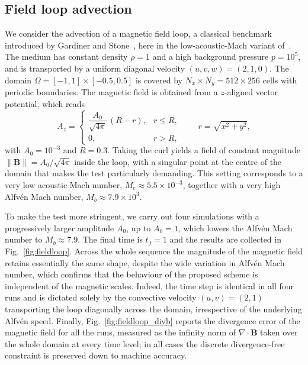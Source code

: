 \documentclass[a4paper,fleqn]{cas-sc}
\theoremstyle{definition}
\theoremstyle{remark}
\begin{document}
\subsection{Field loop advection}

We consider the advection of a magnetic field loop, a classical benchmark
introduced by Gardiner and Stone~\cite{GardinerStone2005}, here in the low-acoustic-Mach
variant of~\cite{BoscheriThomann2024}. The medium has constant density
$\rho=1$ and a high background pressure
$p=10^{5}$, and is transported by a uniform diagonal velocity
$(u,v,w)=(2,1,0)$. The domain $\Omega=[-1,1]\times[-0.5,0.5]$ is covered by
$N_x\times N_y=512\times256$ cells with periodic boundaries. The magnetic field
is obtained from a $z$-aligned vector potential, which reads
%
\begin{equation}
A_z =
\begin{cases}
\dfrac{A_0}{\sqrt{4\pi}}\,(R-r), & r \le R,\\[2mm]
0, & r > R,
\end{cases}
\qquad r=\sqrt{x^2+y^2},
\end{equation}
%
with $A_0=10^{-3}$ and $R=0.3$. Taking the curl yields a field of constant
magnitude $\|\mathbf{B}\|=A_0/\sqrt{4\pi}$ inside the loop, with a singular
point at the centre of the domain that makes the test particularly demanding.
This setting corresponds to a very low acoustic Mach number,
$M_c\approx5.5\times10^{-3}$, together with a very high Alfv\'en Mach number,
$M_b\approx7.9\times10^{3}$. 

To make the test more stringent, we carry out four simulations with a
progressively larger amplitude $A_0$, up to $A_0=1$, which lowers the Alfv\'en
Mach number to $M_b\approx7.9$. The final time is $t_f=1$ and the results are
collected in Fig.~\ref{fig:fieldloop}. Across the whole sequence the magnitude
of the magnetic field retains essentially the same shape, despite the wide
variation in Alfv\'en Mach number, which confirms that the behaviour of the
proposed scheme is independent of the magnetic scales. Indeed, the time step is
identical in all four runs and is dictated solely by the convective velocity
$(u,v)=(2,1)$ transporting the loop diagonally across the domain, irrespective
of the underlying Alfv\'en speed. Finally, Fig.~\ref{fig:fieldloop_divb} reports
the divergence error of the magnetic field for all the runs, measured as the
infinity norm of $\nabla\!\cdot\mathbf{B}$ taken over the whole domain at every
time level; in all cases the discrete divergence-free constraint is preserved
down to machine accuracy.
\end{document}
